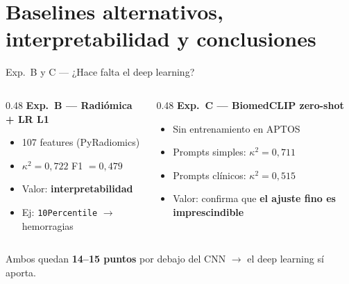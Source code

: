 \documentclass[aspectratio=169, 11pt]{beamer}
\begin{document}
\section{Baselines alternativos, interpretabilidad y conclusiones}

\begin{frame}{Exp.~B y C --- ¿Hace falta el deep learning?}

  \begin{columns}[T]
    \begin{column}{0.48\textwidth}
      \textbf{Exp.~B --- Radiómica + LR L1}
      \begin{itemize}
        \item 107 features (PyRadiomics)
        \item $\kappa^2 = 0{,}722$ \quad F1 $= 0{,}479$
        \item Valor: \textbf{interpretabilidad}
        \item Ej: \texttt{10Percentile} $\to$ hemorragias
      \end{itemize}
    \end{column}
    \begin{column}{0.48\textwidth}
      \textbf{Exp.~C --- BiomedCLIP zero-shot}
      \begin{itemize}
        \item Sin entrenamiento en APTOS
        \item Prompts simples: $\kappa^2 = 0{,}711$
        \item Prompts clínicos: $\kappa^2 = 0{,}515$
        \item Valor: confirma que \textbf{el ajuste fino es imprescindible}
      \end{itemize}
    \end{column}
  \end{columns}

  \vspace{8pt}
  \centering
  \begin{block}{}
    \centering
    Ambos quedan \textbf{14--15 puntos} por debajo del CNN $\to$ el deep learning sí aporta.
  \end{block}
\end{frame}
\end{document}
